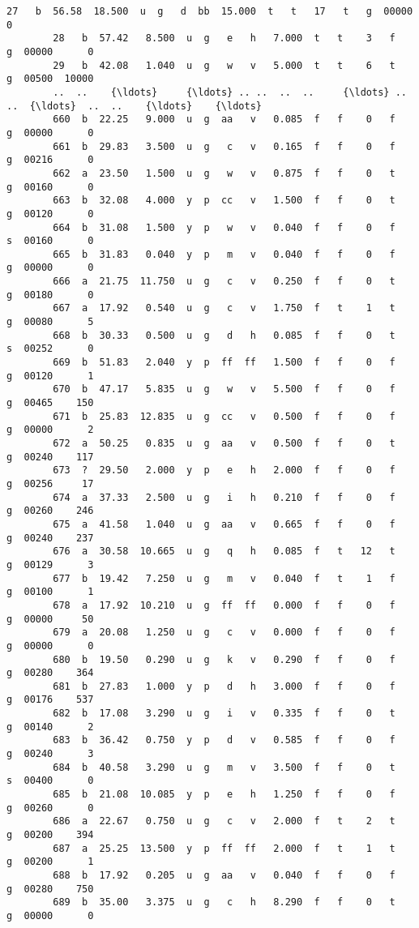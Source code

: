 \documentclass[11pt]{article}
\begin{document}
\begin{Verbatim}[commandchars=\\\{\}]
        27   b  56.58  18.500  u  g   d  bb  15.000  t   t   17   t   g  00000      0   
        28   b  57.42   8.500  u  g   e   h   7.000  t   t    3   f   g  00000      0   
        29   b  42.08   1.040  u  g   w   v   5.000  t   t    6   t   g  00500  10000   
        ..  ..    {\ldots}     {\ldots} .. ..  ..  ..     {\ldots} ..  ..  {\ldots}  ..  ..    {\ldots}    {\ldots}   
        660  b  22.25   9.000  u  g  aa   v   0.085  f   f    0   f   g  00000      0   
        661  b  29.83   3.500  u  g   c   v   0.165  f   f    0   f   g  00216      0   
        662  a  23.50   1.500  u  g   w   v   0.875  f   f    0   t   g  00160      0   
        663  b  32.08   4.000  y  p  cc   v   1.500  f   f    0   t   g  00120      0   
        664  b  31.08   1.500  y  p   w   v   0.040  f   f    0   f   s  00160      0   
        665  b  31.83   0.040  y  p   m   v   0.040  f   f    0   f   g  00000      0   
        666  a  21.75  11.750  u  g   c   v   0.250  f   f    0   t   g  00180      0   
        667  a  17.92   0.540  u  g   c   v   1.750  f   t    1   t   g  00080      5   
        668  b  30.33   0.500  u  g   d   h   0.085  f   f    0   t   s  00252      0   
        669  b  51.83   2.040  y  p  ff  ff   1.500  f   f    0   f   g  00120      1   
        670  b  47.17   5.835  u  g   w   v   5.500  f   f    0   f   g  00465    150   
        671  b  25.83  12.835  u  g  cc   v   0.500  f   f    0   f   g  00000      2   
        672  a  50.25   0.835  u  g  aa   v   0.500  f   f    0   t   g  00240    117   
        673  ?  29.50   2.000  y  p   e   h   2.000  f   f    0   f   g  00256     17   
        674  a  37.33   2.500  u  g   i   h   0.210  f   f    0   f   g  00260    246   
        675  a  41.58   1.040  u  g  aa   v   0.665  f   f    0   f   g  00240    237   
        676  a  30.58  10.665  u  g   q   h   0.085  f   t   12   t   g  00129      3   
        677  b  19.42   7.250  u  g   m   v   0.040  f   t    1   f   g  00100      1   
        678  a  17.92  10.210  u  g  ff  ff   0.000  f   f    0   f   g  00000     50   
        679  a  20.08   1.250  u  g   c   v   0.000  f   f    0   f   g  00000      0   
        680  b  19.50   0.290  u  g   k   v   0.290  f   f    0   f   g  00280    364   
        681  b  27.83   1.000  y  p   d   h   3.000  f   f    0   f   g  00176    537   
        682  b  17.08   3.290  u  g   i   v   0.335  f   f    0   t   g  00140      2   
        683  b  36.42   0.750  y  p   d   v   0.585  f   f    0   f   g  00240      3   
        684  b  40.58   3.290  u  g   m   v   3.500  f   f    0   t   s  00400      0   
        685  b  21.08  10.085  y  p   e   h   1.250  f   f    0   f   g  00260      0   
        686  a  22.67   0.750  u  g   c   v   2.000  f   t    2   t   g  00200    394   
        687  a  25.25  13.500  y  p  ff  ff   2.000  f   t    1   t   g  00200      1   
        688  b  17.92   0.205  u  g  aa   v   0.040  f   f    0   f   g  00280    750   
        689  b  35.00   3.375  u  g   c   h   8.290  f   f    0   t   g  00000      0   
        

\end{Verbatim}
\end{document}
